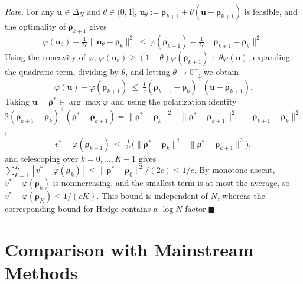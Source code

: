 \documentclass{article}
\theoremstyle{plain}
\theoremstyle{remark}
\newcommand{\simplex}{\Delta}
\newcommand{\bu}{{\bm{u}}}
\newcommand{\brho}{{\bm{\rho}}}
\begin{document}
\textit{Rate.} For any $\bu\in\simplex_N$ and $\theta\in(0,1]$, $\bu_\theta:=\brho_{k+1}+\theta(\bu-\brho_{k+1})$ is feasible, and the optimality of $\brho_{k+1}$ gives
\[
\varphi(\bu_\theta)-\tfrac1{2c}\|\bu_\theta-\brho_k\|^2\ \le\ \varphi(\brho_{k+1})-\tfrac1{2c}\|\brho_{k+1}-\brho_k\|^2 .
\]
Using the concavity of $\varphi$, $\varphi(\bu_\theta)\ge(1-\theta)\varphi(\brho_{k+1})+\theta\varphi(\bu)$, expanding the quadratic term, dividing by $\theta$, and letting $\theta\to0^+$, we obtain
\[
\varphi(\bu)-\varphi(\brho_{k+1})\ \le\ \tfrac1c(\brho_{k+1}-\brho_k)^\top(\bu-\brho_{k+1}) .
\]
Taking $\bu=\brho^*\in\arg\max\varphi$ and using the polarization identity $2(\brho_{k+1}-\brho_k)^\top(\brho^*-\brho_{k+1})=\|\brho^*-\brho_k\|^2-\|\brho^*-\brho_{k+1}\|^2-\|\brho_{k+1}-\brho_k\|^2$,
\[
v^*-\varphi(\brho_{k+1})\ \le\ \tfrac1{2c}\big(\|\brho^*-\brho_k\|^2-\|\brho^*-\brho_{k+1}\|^2\big),
\]
and telescoping over $k=0,\dots,K-1$ gives $\sum_{k=1}^K[v^*-\varphi(\brho_k)]\le\|\brho^*-\brho_0\|^2/(2c)\le1/c$. By monotone ascent, $v^*-\varphi(\brho_k)$ is nonincreasing, and the smallest term is at most the average, so $v^*-\varphi(\brho_K)\le1/(cK)$. This bound is independent of $N$, whereas the corresponding bound for Hedge contains a $\log N$ factor.\hfill$\blacksquare$

\section{Comparison with Mainstream Methods}
\label{app:related}
\end{document}
